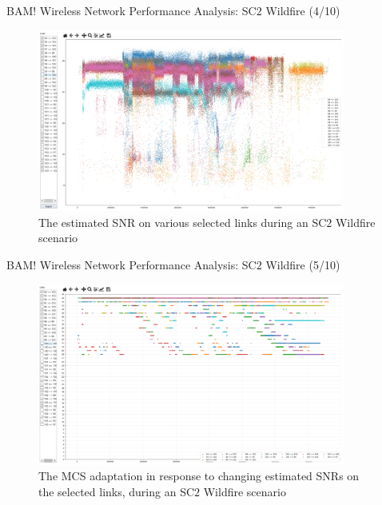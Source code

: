 \documentclass{beamer}
\begin{document}
\begin{frame}{BAM! Wireless Network Performance Analysis: SC$2$ Wildfire (4/10)}
\begin{figure}
    \centering
    \includegraphics[width = 0.90\textwidth]{Wildfire_SNR.PNG}
    \caption{The estimated SNR on various selected links during an SC$2$ Wildfire scenario}
    \label{fig:22}
\end{figure}
\end{frame}
\begin{frame}{BAM! Wireless Network Performance Analysis: SC$2$ Wildfire (5/10)}
\begin{figure}
    \centering
    \includegraphics[width = 0.90\textwidth]{Wildfire_MCS.PNG}
    \caption{The MCS adaptation in response to changing estimated SNRs on the selected links, during an SC$2$ Wildfire scenario}
    \label{fig:23}
\end{figure}
\end{frame}
\end{document}
